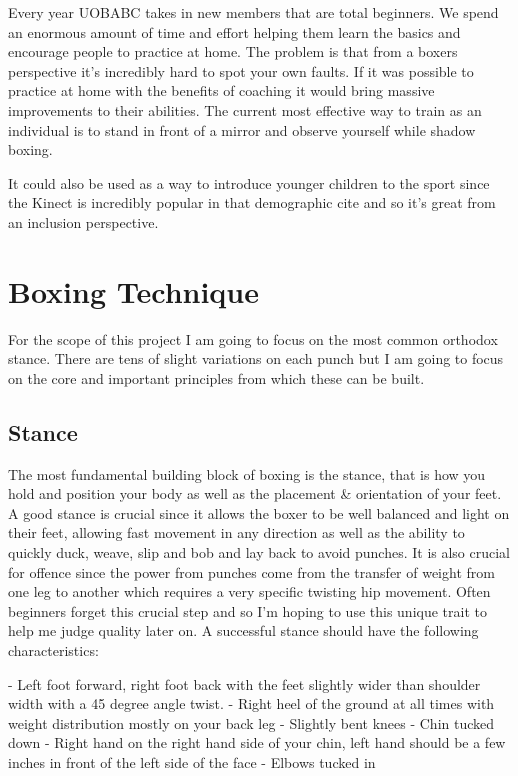 Every year UOBABC takes in new members that are total beginners. We spend an enormous amount of time and effort helping them learn the basics and encourage people to practice at home. The problem is that from a boxers perspective it’s incredibly hard to spot your own faults. If it was possible to practice at home with the benefits of coaching it would bring massive improvements to their abilities. The current most effective way to train as an individual is to stand in front of a mirror and observe yourself while shadow boxing.

It could also be used as a way to introduce younger children to the sport since the Kinect is incredibly popular in that demographic {cite} and so it’s great from an inclusion perspective.


\section{Boxing Technique}
\label{sec:sec02}
For the scope of this project I am going to focus on the most common orthodox stance. There are tens of slight variations on each punch but I am going to focus on the core and important principles from which these can be built.

\subsection{Stance}
\label{subsec:subsec02}
The most fundamental building block of boxing is the stance, that is how you hold and position your body as well as the placement \& orientation of your feet. A good stance is crucial since it allows the boxer to be well balanced and light on their feet, allowing fast movement in any direction as well as the ability to quickly duck, weave, slip and bob and lay back to avoid punches. It is also crucial for offence since the power from punches come from the transfer of weight from one leg to another which requires a very specific twisting hip movement. Often beginners forget this crucial step and so I'm hoping to use this unique trait to help me judge quality later on. A successful stance should have the following characteristics:

- Left foot forward, right foot back with the feet slightly wider than shoulder width with a 45 degree angle twist.
- Right heel of the ground at all times with weight distribution mostly on your back leg
- Slightly bent knees
- Chin tucked down
- Right hand on the right hand side of your chin, left hand should be a few inches in front of the left side of the face
- Elbows tucked in

